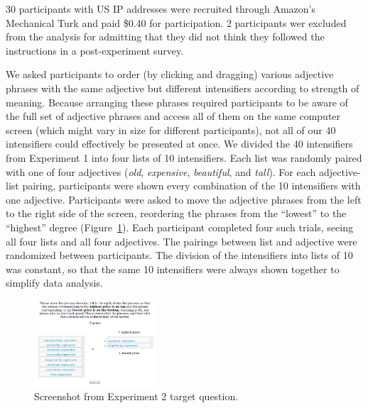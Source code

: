 \documentclass[10pt,letterpaper]{article}
\newcommand{\w}[1]{\emph{#1}}
\begin{document}
30 participants with US IP addresses were recruited through Amazon's Mechanical Turk and paid \$0.40 for  participation. 2 participants wer excluded from the analysis for admitting that they did not think they followed the instructions in a post-experiment survey.

We asked participants to order (by clicking and dragging) various adjective phrases with the same adjective but different intensifiers according to strength of meaning. Because arranging these phrases required participants to be aware of the full set of adjective phrases and access all of them on the same computer screen (which might vary in size for different participants), not all of our 40 intensifiers could effectively be presented at once. We divided the 40 intensifiers from Experiment 1 into four lists of 10 intensifiers. 
Each list was randomly paired with one of four adjectives (\w{old}, \w{expensive}, \w{beautiful}, and \w{tall}).
For each adjective-list pairing, participants were shown every combination of the 10 intensifiers with one adjective.
Participants were asked to move the adjective phrases from the left to the right side of the screen, reordering the phrases from the ``lowest'' to the ``highest'' degree (Figure~\ref{exp2-q}).
Each participant completed four such trials, seeing all four lists and all four adjectives.
The pairings between list and adjective were randomized between participants.
The division of the intensifiers into lists of 10 was constant, so that the same 10 intensifiers were always shown together to simplify data analysis.

\begin{figure}[hbt]
\begin{center}
\includegraphics[width=0.4\textwidth]{exp2-q.png}
\end{center}
\caption{Screenshot from Experiment 2 target question.} 
\label{exp2-q}
\end{figure}
\end{document}
